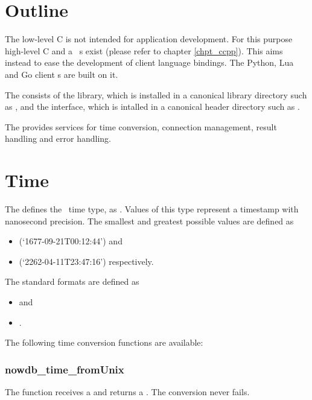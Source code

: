 \section{Outline}
The low-level C  is not intended
for application development. For this purpose
high-level C and a \CC\ s exist
(please refer to chapter \ref{chpt_ccpp}).
This  aims instead to ease
the development of client language bindings.
The Python, Lua and Go client s
are built on it.

The  consists of the 
library, which is installed in a canonical library directory
such as ,
and the  interface,
which is intalled in a canonical header directory
such as .

The  provides services for
time conversion, connection management,
result handling and error handling.

\section{Time}
The  defines the \nowdb\ time type,
 as .
Values of this type represent a 
timestamp with nanosecond precision.
The smallest and greatest possible values
are defined as 
\begin{itemize}
\item {}
(`1677-09-21T00:12:44')
and
\item {}
(`2262-04-11T23:47:16')
respectively.
\end{itemize}

The standard formats are defined as
\begin{itemize}
\item {}
 and
\item {}
. 
\end{itemize}

The following time conversion functions are available:

\subsubsection{nowdb\_time\_fromUnix}
The function receives a  
and returns a . The conversion never fails.

